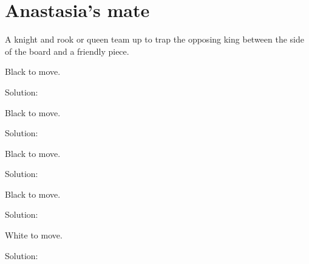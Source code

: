 \documentclass{book}
\begin{document}
\section{Anastasia's mate}
A knight and rook or queen team up to trap the opposing king between the side of the board and a friendly piece.\begin{multicols}{2} 
\begin{samepage} 
\newgame 


 
\showboard
 
 Black to move. 
 
Solution: 
 
\end{samepage}\begin{samepage} 
\newgame 


 
\showboard
 
 Black to move. 
 
Solution: 
 
\end{samepage}\begin{samepage} 
\newgame 


 
\showboard
 
 Black to move. 
 
Solution: 
 
\end{samepage}\begin{samepage} 
\newgame 


 
\showboard
 
 Black to move. 
 
Solution: 
 
\end{samepage}\begin{samepage} 
\newgame 


 
\showboard
 
 White to move. 
 
Solution: 
 
\end{samepage}\end{multicols} 
\newpage 
\end{document}

